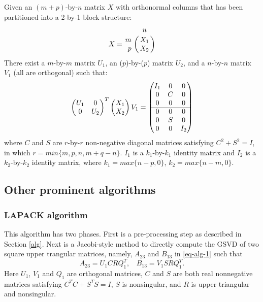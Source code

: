     Given an $(m+p)$-by-$n$ matrix $X$ with orthonormal columns that has been partitioned into a 2-by-1 block structure: 
        \begin{displaymath}
            X = \bordermatrix{ & n  \cr
            \hfill m & X_1 \cr
            \hfill p & X_2}
        \end{displaymath}
    There exist a $m$-by-$m$ matrix $U_1$, an ($p$)-by-($p$) matrix $U_2$, and a $n$-by-$n$ matrix $V_1$ (all are orthogonal) such that:
        \begin{displaymath}
            \begin{pmatrix}
                U_1 & 0 \\
                0 & U_2
            \end{pmatrix}^{T}
            \begin{pmatrix}
                X_1 \\
                X_2
            \end{pmatrix}V_1 = 
            \begin{pmatrix}
                I_1 & 0 & 0 \\
                0 & C & 0 \\
                0 & 0 & 0 \\
                \cline{1-3} 
                0 & 0 & 0 \\
                0 & S & 0 \\
                0 & 0 & I_2
            \end{pmatrix}
        \end{displaymath}
    where $C$ and $S$ are $r$-by-$r$ non-negative diagonal matrices satisfying $C^2 + S^2 = I$, in which $r = min\{m,p,n,m+q-n\}$. $I_1$ is a $k_1$-by-$k_1$ identity matrix and $I_2$ is a $k_2$-by-$k_2$ identity matrix, where $k_1 = max\{n-p,0\}$, $k_2 = max\{n-m,0\}$.


    
    \subsection{Other prominent algorithms}  

    \subsubsection{LAPACK algorithm}\label{LAPACKalg}
    This algorithm \cite[pp.~51--53]{anderson1999lapack} has two phases.  First is a pre-processing step as described in Section \ref{alg}. Next is a Jacobi-style method \cite{paige1986computing} \cite{bai1993computing} to directly compute the GSVD of two square upper trangular matrices, namely, $A_{23}$ and $B_{13}$ in \eqref{eq-alg-1} such that
    \begin{equation} \label{eq-alg-jacobi}
        A_{23} = U_1CRQ_1^{T},\ \ \ \ B_{13} = V_1SRQ_1^{T}.
    \end{equation}
    Here $U_1$, $V_1$ and $Q_1$ are orthogonal matrices, $C$ and $S$ are both real nonnegative matrices satisfying $C^TC + S^TS = I$, $S$ is nonsingular, and $R$ is upper triangular and nonsingular.
    
